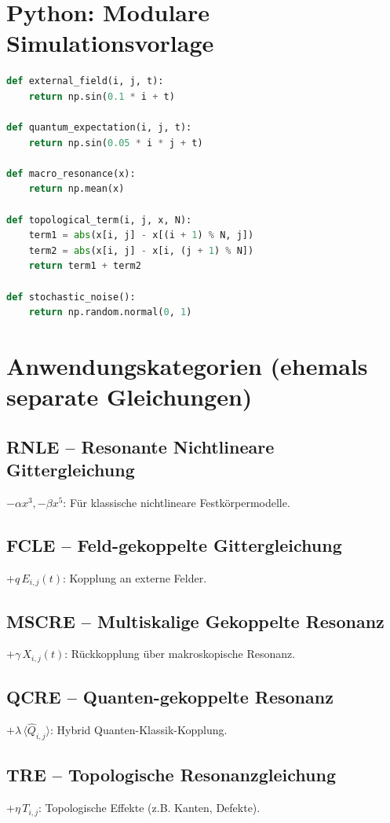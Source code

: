 \documentclass[12pt]{article}
\begin{document}
\clearpage

\section*{Python: Modulare Simulationsvorlage}
\begin{lstlisting}[language=Python]
def external_field(i, j, t):
    return np.sin(0.1 * i + t)

def quantum_expectation(i, j, t):
    return np.sin(0.05 * i * j + t)

def macro_resonance(x):
    return np.mean(x)

def topological_term(i, j, x, N):
    term1 = abs(x[i, j] - x[(i + 1) % N, j])
    term2 = abs(x[i, j] - x[i, (j + 1) % N])
    return term1 + term2

def stochastic_noise():
    return np.random.normal(0, 1)
\end{lstlisting}

\clearpage

\section*{\small Anwendungskategorien (ehemals separate Gleichungen)}

\subsection*{RNLE -- Resonante Nichtlineare Gittergleichung}
$-\alpha x^3, -\beta x^5$: Für klassische nichtlineare Festkörpermodelle.

\subsection*{FCLE -- Feld-gekoppelte Gittergleichung}
$+ q\, E_{i,j}(t)$: Kopplung an externe Felder.

\subsection*{MSCRE -- Multiskalige Gekoppelte Resonanz}
$+ \gamma\, X_{i,j}(t)$: Rückkopplung über makroskopische Resonanz.

\subsection*{QCRE -- Quanten-gekoppelte Resonanz}
$+ \lambda\, \langle \hat{Q}_{i,j} \rangle$: Hybrid Quanten-Klassik-Kopplung.

\subsection*{TRE -- Topologische Resonanzgleichung}
$+ \eta\, T_{i,j}$: Topologische Effekte (z.B. Kanten, Defekte).
\end{document}
